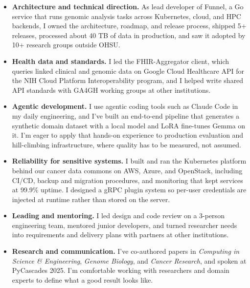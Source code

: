 \begin{itemize}[itemsep=0pt, topsep=1pt]

\item \textbf{Architecture and technical direction.} As lead developer of Funnel, a Go service that runs genomic analysis tasks across Kubernetes, cloud, and HPC backends, I owned the architecture, roadmap, and release process, shipped 5+ releases, processed about 40 TB of data in production, and saw it adopted by 10+ research groups outside OHSU.

\item \textbf{Health data and standards.} I led the FHIR-Aggregator client, which queries linked clinical and genomic data on Google Cloud Healthcare API for the NIH Cloud Platform Interoperability program, and I helped write shared API standards with GA4GH working groups at other institutions.

\item \textbf{Agentic development.} I use agentic coding tools such as Claude Code in my daily engineering, and I've built an end-to-end pipeline that generates a synthetic domain dataset with a local model and LoRA fine-tunes Gemma on it. I'm eager to apply that hands-on experience to production evaluation and hill-climbing infrastructure, where quality has to be measured, not assumed.

\item \textbf{Reliability for sensitive systems.} I built and ran the Kubernetes platform behind our cancer data commons on AWS, Azure, and OpenStack, including CI/CD, backup and migration procedures, and monitoring that kept services at 99.9\% uptime. I designed a gRPC plugin system so per-user credentials are injected at runtime rather than stored on the server.

\item \textbf{Leading and mentoring.} I led design and code review on a 3-person engineering team, mentored junior developers, and turned researcher needs into requirements and delivery plans with partners at other institutions.

\item \textbf{Research and communication.} I've co-authored papers in \emph{Computing in Science \& Engineering}, \emph{Genome Biology}, and \emph{Cancer Research}, and spoken at PyCascades 2025. I'm comfortable working with researchers and domain experts to define what a good result looks like.

\end{itemize}

